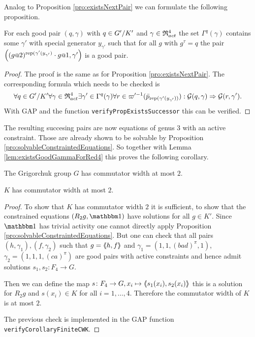 \documentclass[a4paper,11pt]{amsart}
\begin{document}
Analog to Proposition \ref{pro:existsNextPair} we can formulate the following proposition.
\begin{pro}\label{pro:existsNextPair4}
 For each good pair $(q,\gamma)$ with $q\in{G'/K'}$ and $\gamma\in\mathfrak{R}^4_{act}$ the set $\Gamma^q(\gamma)$ 
 contains some $\gamma'$ with special generator $y_{\gamma'}$ such that for all $g$ with $g^\tau=q$ the
 pair $\left((g\at{2})^{\textup{rep}(\gamma'(y_{\gamma'})}\cdot g\at{1},\gamma'\right)$ is a good pair.
\end{pro}
\begin{proof}
The proof is the same as for Proposition \ref{pro:existsNextPair}. The corresponding formula which needs to be checked is 
\[\forall q\in{G'/K'}
      \forall \gamma\in\mathfrak{R}^4_{act} 
	 \exists \gamma'\in \Gamma^q(\gamma)
	    \forall r\in \varpi'^{-1}(\bar p_{\textup{rep}(\gamma'(y_{\gamma'}))}):
	      \mathcal{G}(q,\gamma) \Rightarrow \mathcal{G}(r,\gamma').\]
 With GAP and the function \lstinline{verifyPropExistsSuccessor} this can be verified. 
\end{proof}
The resulting succesing pairs are now equations of genus $3$ with an active constraint. Those are already shown to be solvable 
by Proposition \ref{pro:solvableConstraintedEquations}. So together with Lemma \ref{lem:existsGoodGammaForRed4} this proves the following corollary.
\begin{cor}\label{cor:GhasCW2}
 The Grigorchuk group $G$ has commutator width at most $2$.
\end{cor}
\begin{cor}\label{cor:KhasCW2}
 $K$ has commutator width at most $2$. 
\end{cor}
\begin{proof}
 To show that $K$ has commutator width $2$ it is sufficient, to show that the constrained equations $(R_2g,\id)$ have solutions for all $g\in K'$. 
 Since $\id$ has trivial activity one cannot directly apply Proposition \ref{pro:solvableConstraintedEquations}.
 But one can check that all pairs $(h,\gamma_1),(f,\gamma_2)$
 such that $g=\langle\negthickspace\langle h,f\rangle\negthickspace\rangle$ and $\gamma_1=(1,1,(bad)^\pi,1)$, $\gamma_2=(1,1,1,(ca)^\pi)$
 are good pairs with active constraints and hence admit solutions $s_1,s_2\colon F_4\to G$.
 
 Then we can define the map $s\colon F_4\to G, x_i\mapsto \langle\negthickspace\langle s_1(x_i),s_2(x_i)\rangle\negthickspace\rangle$ this is a solution
 for $R_2g$ and $s(x_i)\in K$ for all $i=1,\ldots,4$. Therefore the commutator width of $K$ is at most $2$.
 
 The previous check is implemented in the GAP function \lstinline{verifyCorollaryFiniteCWK}. 
\end{proof}
\end{document}
